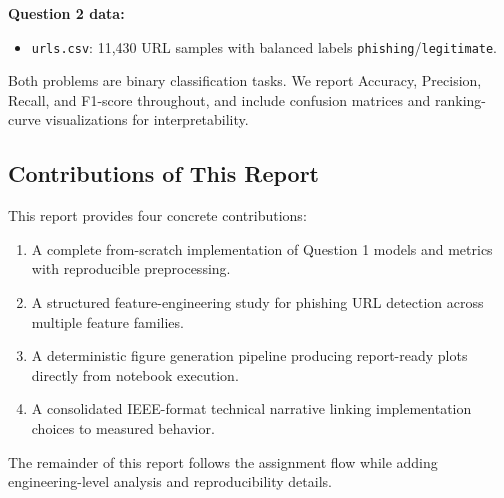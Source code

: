 \textbf{Question 2 data:}
\begin{itemize}
    \item \texttt{urls.csv}: 11,430 URL samples with balanced labels \texttt{phishing}/\texttt{legitimate}.
\end{itemize}

Both problems are binary classification tasks. We report Accuracy, Precision, Recall, and F1-score throughout, and include confusion matrices and ranking-curve visualizations for interpretability.

\subsection{Contributions of This Report}

This report provides four concrete contributions:
\begin{enumerate}
    \item A complete from-scratch implementation of Question 1 models and metrics with reproducible preprocessing.
    \item A structured feature-engineering study for phishing URL detection across multiple feature families.
    \item A deterministic figure generation pipeline producing report-ready plots directly from notebook execution.
    \item A consolidated IEEE-format technical narrative linking implementation choices to measured behavior.
\end{enumerate}

The remainder of this report follows the assignment flow while adding engineering-level analysis and reproducibility details.
